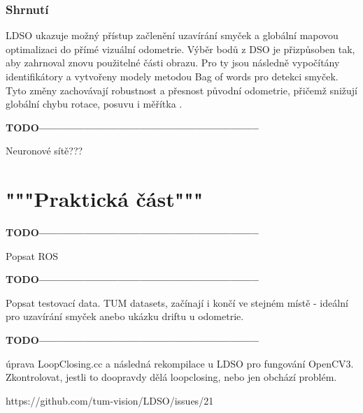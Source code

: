 \documentclass[12pt,a4paper]{article}
\begin{document}
\subsubsection*{Shrnutí}
LDSO ukazuje možný přístup začlenění uzavírání smyček a globální mapovou optimalizaci do přímé vizuální odometrie. Výběr bodů z DSO je přizpůsoben tak, aby zahrnoval znovu použitelné části obrazu. Pro ty jsou následně vypočítány identifikátory a vytvořeny modely metodou Bag of words pro detekci smyček. Tyto změny zachovávají robustnost a přesnost původní odometrie, přičemž snižují globální chybu rotace, posuvu i měřítka \cite{LDSO}.




\textsf{\textbf{TODO-----------------------------------------------------------}}


Neuronové sítě???

\section{"""Praktická část"""}

\textsf{\textbf{TODO-----------------------------------------------------------}}

Popsat ROS

\textsf{\textbf{TODO-----------------------------------------------------------}}

Popsat testovací data. TUM datasets, začínají i končí ve stejném místě - ideální pro uzavírání smyček anebo ukázku driftu u odometrie.

\textsf{\textbf{TODO-----------------------------------------------------------}}

úprava LoopClosing.cc a následná rekompilace u LDSO pro fungování OpenCV3. Zkontrolovat, jestli to doopravdy dělá loopclosing, nebo jen obchází problém.

https://github.com/tum-vision/LDSO/issues/21



\end{document}
